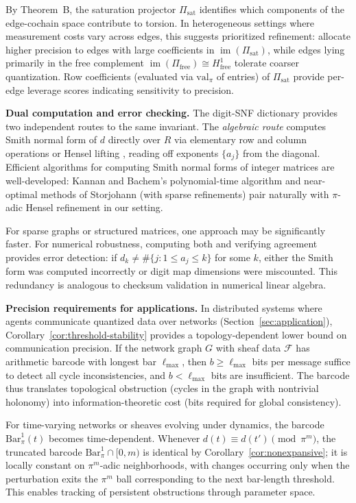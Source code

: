 \documentclass[11pt]{amsart}
\theoremstyle{plain}
\theoremstyle{definition}
\newcommand{\valpi}{\mathrm{val}_{\unif}}                   %
\newcommand{\Ring}{R}                          %
\newcommand{\unif}{\pi}                        %
\newcommand{\sheaf}[1]{\mathcal{#1}}                  %
\newcommand{\sat}{\mathrm{sat}}
\newcommand{\free}{\mathrm{free}}
\newcommand{\coboundary}{d}                           %
\DeclareMathOperator{\im}{im}                         %
\begin{document}
By Theorem~B, the saturation projector $\Pi_{\sat}$ identifies which components of the edge-cochain space contribute to torsion. In heterogeneous settings where measurement costs vary across edges, this suggests prioritized refinement: allocate higher precision to edges with large coefficients in $\im(\Pi_{\sat})$, while edges lying primarily in the free complement $\im(\Pi_{\free}) \cong H^1_{\free}$ tolerate coarser quantization. Row coefficients (evaluated via $\valpi$ of entries) of $\Pi_{\sat}$ provide per-edge leverage scores indicating sensitivity to precision.

\textbf{Dual computation and error checking.}
The digit-SNF dictionary provides two independent routes to the same invariant. The \emph{algebraic route} computes Smith normal form of $\coboundary$ directly over $\Ring$ via elementary row and column operations or Hensel lifting \cite{Kannan1979}, reading off exponents $\{a_j\}$ from the diagonal. Efficient algorithms for computing Smith normal forms of integer matrices are well-developed: Kannan and Bachem's polynomial-time algorithm \cite{Kannan1979} and near-optimal methods of Storjohann \cite{Storjohann1996_NearOptimalSNF} (with sparse refinements) pair naturally with $\unif$-adic Hensel refinement in our setting.

For sparse graphs or structured matrices, one approach may be significantly faster. For numerical robustness, computing both and verifying agreement provides error detection: if $d_k \neq \#\{j : 1 \le a_j \le k\}$ for some $k$, either the Smith form was computed incorrectly or digit map dimensions were miscounted. This redundancy is analogous to checksum validation in numerical linear algebra.

\textbf{Precision requirements for applications.}
In distributed systems where agents communicate quantized data over networks (Section~\ref{sec:application}), Corollary~\ref{cor:threshold-stability} provides a topology-dependent lower bound on communication precision. If the network graph $G$ with sheaf data $\sheaf{F}$ has arithmetic barcode with longest bar $\ell_{\max}$, then $b \ge \ell_{\max}$ bits per message suffice to detect all cycle inconsistencies, and $b < \ell_{\max}$ bits are insufficient. The barcode thus translates topological obstruction (cycles in the graph with nontrivial holonomy) into information-theoretic cost (bits required for global consistency).

For time-varying networks or sheaves evolving under dynamics, the barcode $\mathrm{Bar}^1_\unif(t)$ becomes time-dependent. Whenever $\coboundary(t) \equiv \coboundary(t') \pmod{\unif^m}$, the truncated barcode $\mathrm{Bar}^1_\unif \cap [0,m)$ is identical by Corollary~\ref{cor:nonexpansive}; it is locally constant on $\unif^m$-adic neighborhoods, with changes occurring only when the perturbation exits the $\unif^m$ ball corresponding to the next bar-length threshold. This enables tracking of persistent obstructions through parameter space.
\end{document}
